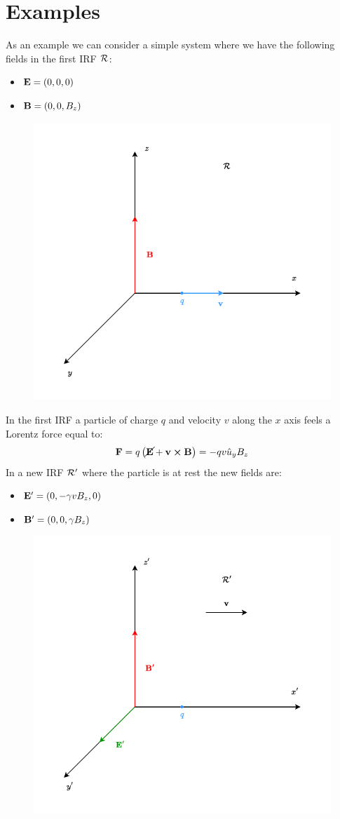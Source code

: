 \section{Examples}
As an example we can consider a simple system where we have the following fields in the first IRF $\mathcal{R}$:
\begin{itemize}
  \item $\vb{E} = \left(0,0,0\right)$
  \item $\vb{B} = \left(0,0,B_z\right)$
\end{itemize}
\begin{figure}[H]
  \centering
  \includegraphics[width=0.6\linewidth]{res/svg/moving_particle_z_magnetic_irf1.drawio}
\end{figure}
In the first IRF a particle of charge $q$ and velocity $v$ along the $x$ axis feels a Lorentz force equal to:
\begin{equation}
  \vb{F} = q\left(\cancel{\vb{E}} + \vb{v} \cross \vb{B}\right) = -qv\hat{u}_yB_z
\end{equation}
In a new IRF $\mathcal{R}'$ where the particle is at rest the new fields are:
\begin{itemize}
  \item $\vb{E}' = \left(0,-\gamma v B_z,0\right)$
  \item $\vb{B}' = \left(0,0,\gamma B_z\right)$
\end{itemize}
\begin{figure}[H]
  \centering
  \includegraphics[width=0.6\linewidth]{res/svg/moving_particle_z_magnetic_irf2.drawio}
\end{figure}
